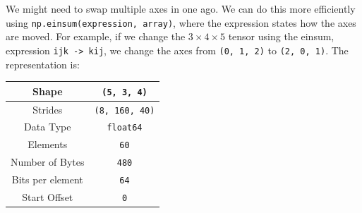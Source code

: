 \documentclass[a4paper, openany]{memoir}
\begin{document}
    We might need to swap multiple axes in one ago. We can do this more efficiently using \texttt{np.einsum(expression, array)}, where the expression states how the axes are moved. For example, if we change the $3 \times 4 \times 5$ tensor using the einsum, expression \texttt{ijk -> kij}, we change the axes from \texttt{(0, 1, 2)} to \texttt{(2, 0, 1)}. The representation is:
    \begin{table}[H]
        \centering
        \begin{tabular}{|c|c|}
            \hline
            Shape & \texttt{(5, 3, 4)} \\
            \hline
            Strides & \texttt{(8, 160, 40)} \\
            \hline
            Data Type & \texttt{float64} \\
            \hline
            Elements & \texttt{60} \\
            \hline
            Number of Bytes & \texttt{480} \\
            \hline
            Bits per element & \texttt{64} \\
            \hline
            Start Offset & \texttt{0} \\
            \hline
        \end{tabular}
    \end{table}
    
\end{document}
